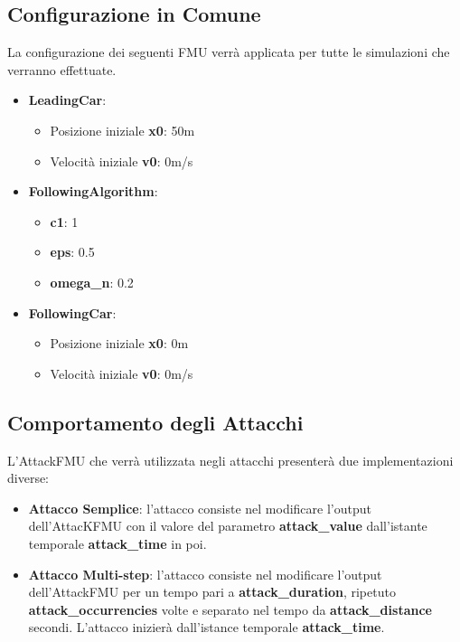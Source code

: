 \subsection{Configurazione in Comune}
La configurazione dei seguenti FMU verrà applicata per tutte le simulazioni che verranno effettuate.
\begin{itemize}
	\item \textbf{LeadingCar}:
	\begin{itemize}
		\item Posizione iniziale \textbf{x0}: 50m
		\item Velocità iniziale \textbf{v0}: 0m/s
	\end{itemize}
	
	\item \textbf{FollowingAlgorithm}:
	\begin{itemize}
		\item \textbf{c1}: 1
		\item \textbf{eps}: 0.5
		\item \textbf{omega\_n}: 0.2
	\end{itemize}
	
	
	\item \textbf{FollowingCar}:
	\begin{itemize}
		\item Posizione iniziale \textbf{x0}: 0m
		\item Velocità iniziale \textbf{v0}: 0m/s
	\end{itemize}
\end{itemize}
\subsection{Comportamento degli Attacchi}
L'AttackFMU che verrà utilizzata negli attacchi presenterà due implementazioni diverse:
\begin{itemize}
\item \textbf{Attacco Semplice}: l'attacco consiste nel modificare l'output dell'AttacKFMU con il valore del parametro \textbf{attack\_value} dall'istante temporale \textbf{attack\_time} in poi.
\item \textbf{Attacco Multi-step}: l'attacco consiste nel modificare l'output dell'AttackFMU per un tempo pari a \textbf{attack\_duration}, ripetuto \textbf{attack\_occurrencies} volte e separato nel tempo da \textbf{attack\_distance} secondi. L'attacco inizierà dall'istance temporale \textbf{attack\_time}.

\end{itemize}